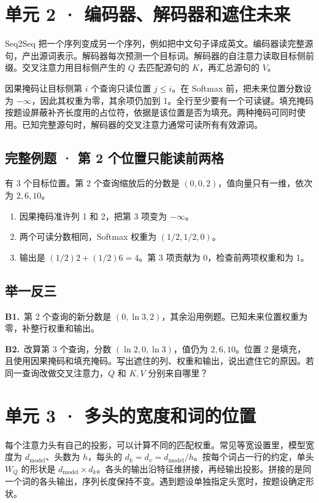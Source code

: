 \documentclass[UTF8,a4paper,11pt]{ctexart}
\newcommand{\CompactQuestion}[2]{\par\noindent\textbf{#1.}\ #2\par\vspace{.8em}}
\begin{document}
\section{单元 2 · 编码器、解码器和遮住未来}
Seq2Seq 把一个序列变成另一个序列，例如把中文句子译成英文。编码器读完整源句，产出源词表示。解码器每次预测一个目标词。解码器的自注意力读取目标侧前缀。交叉注意力用目标侧产生的 $Q$ 去匹配源句的 $K$，再汇总源句的 $V$。

因果掩码让目标侧第 $i$ 个查询只读位置 $j\le i$。在 Softmax 前，把未来位置分数设为 $-\infty$，因此其权重为零，其余项仍加到 1。全行至少要有一个可读键。填充掩码按题设屏蔽补齐长度用的占位符，依据是该位置是否为填充。两种掩码可同时使用。已知完整源句时，解码器的交叉注意力通常可读所有有效源词。

\subsection{完整例题 · 第 2 个位置只能读前两格}
有 3 个目标位置。第 2 个查询缩放后的分数是 $(0,0,2)$，值向量只有一维，依次为 $2,6,10$。

\begin{enumerate}
\item 因果掩码准许列 1 和 2，把第 3 项变为 $-\infty$。
\item 两个可读分数相同，Softmax 权重为 $(1/2,1/2,0)$。
\item 输出是 $(1/2)2+(1/2)6=4$。第 3 项贡献为 0，检查前两项权重和为 1。
\end{enumerate}
\subsection{举一反三}
\CompactQuestion{B1}{第 2 个查询的新分数是 $(0,\ln3,2)$，其余沿用例题。已知未来位置权重为零，补整行权重和输出。}
\CompactQuestion{B2}{改算第 3 个查询，分数 $(\ln2,0,\ln3)$，值仍为 $2,6,10$。位置 2 是填充，且使用因果掩码和填充掩码。写出遮住的列、权重和输出，说出遮住它的原因。若同一查询改做交叉注意力，$Q$ 和 $K,V$ 分别来自哪里？}
\clearpage
\section{单元 3 · 多头的宽度和词的位置}
每个注意力头有自己的投影，可以计算不同的匹配权重。常见等宽设置里，模型宽度为 $d_{\mathrm{model}}$、头数为 $h$，每头的 $d_k=d_v=d_{\mathrm{model}}/h$。按每个词占一行的约定，单头 $W_Q$ 的形状是 $d_{\mathrm{model}}\times d_k$。各头的输出沿特征维拼接，再经输出投影。拼接的是同一个词的各头输出，序列长度保持不变。遇到题设单独指定头宽时，按题设确定形状。
\end{document}
